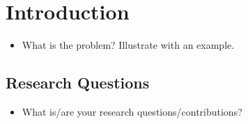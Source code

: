 \section{Introduction}
\begin{itemize}
    \item What is the problem? Illustrate with an example.
\end{itemize}


\subsection{Research Questions}
\begin{itemize}
    \item What is/are your research questions/contributions?
\end{itemize}